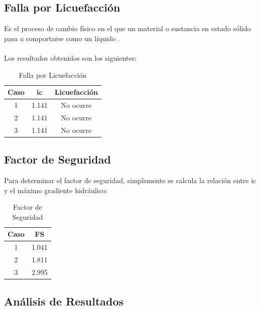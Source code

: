 \subsection{Falla por Licuefacción}

Es el proceso de cambio físico en el que un material o sustancia en estado sólido pasa a comportarse como un líquido \textbf{\cite{WebReference2024}}.
\\ \\
Los resultados obtenidos son los siguientes:

\begin{table}[H]
  \centering
  \begin{tabular}{|c|c|c|}
    \hline
    Caso & ic & Licuefacción\\
    \hline
    1 & 1.141 & No ocurre \\ \hline
    2 & 1.141 & No ocurre \\ \hline
    3 & 1.141 & No ocurre \\
    \hline
  \end{tabular}
  \caption{Falla por Licuefacción}
\end{table}

\subsection{Factor de Seguridad}

Para determinar el factor de seguridad, simplemente se calcula la relación entre ic y el máximo gradiente hidráulico:

\begin{table}[H]
  \centering
  \begin{tabular}{|c|c|}
    \hline
    Caso & FS \\
    \hline
    1 & 1.041 \\ \hline
    2 & 1.811 \\ \hline
    3 & 2.995 \\
    \hline
  \end{tabular}
  \caption{Factor de Seguridad}
\end{table}

\newpage
\subsection{Análisis de Resultados}

